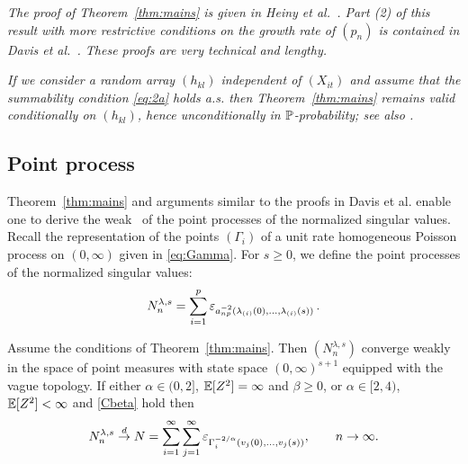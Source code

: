 \begin{remark}\em
The proof of Theorem~\ref{thm:mains} is given in Heiny et al.~\cite{heiny:mikosch:2016:noniid}. Part (2) of this  result
with more restrictive conditions on the growth rate of $(p_n)$ is contained in Davis et al.~\cite{davis:mikosch:pfaffel:2015}.
These proofs are very technical and lengthy.
\end{remark}
\begin{remark}\em
If we consider a random array $(h_{kl})$ independent of  $(X_{it})$ and
assume that the summability
condition \eqref{eq:2a} holds a.s.
then Theorem~\ref{thm:mains} remains valid conditionally on
$(h_{kl})$, hence  unconditionally in $\P$-probability; see also \cite{davis:mikosch:pfaffel:2015}.\end{remark}
\subsection{Point process \con }
Theorem~\ref{thm:mains}  and arguments similar to the proofs in Davis et al. \cite{davis:mikosch:pfaffel:2015}
enable one to derive the weak \con\ of
the point processes of the normalized singular values. Recall
the representation of the points $(\Gamma_i)$ of a unit rate homogeneous Poisson process on $(0,\infty)$
given in \eqref{eq:Gamma}. For $s\ge 0$, we define the point processes of the normalized singular values:
\begin{equation}\label{eq:ppdef}
N_n^{\lambda,s}=\sum_{i=1}^p \vep_{a_{np}^{-2}(\lambda_{(i)}(0),\ldots,\lambda_{(i)}(s))} \,.
\end{equation}

\begin{theorem}\label{cor:1}
Assume the conditions of Theorem~\ref{thm:mains}.
Then $(N_n^{\lambda,s})$ converge weakly in the space of point measures
with state space $(0,\infty)^{s+1}$ equipped with the vague topology.
If either $\alpha \in (0,2]$, $\E[Z^2]=\infty$ and $\beta \ge 0$,
or $\alpha \in [2,4)$, $\E[Z^2]<\infty$ and \ref{Cbeta} hold then
\begin{equation}\label{eq:pp}
N_n^{\lambda,s} \cid N= \sum_{i=1}^\infty
\sum_{j=1}^{\infty} \vep_{\Gamma_i^{-2/\alpha} (v_j(0),\ldots,v_j(s))}, \qquad \nto.
\end{equation}
\end{theorem}

